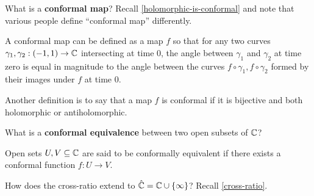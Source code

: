 \documentclass{homework}
\begin{document}
                                                    \begin{problem}
                                                      What is a \textbf{conformal map}?  Recall
                                                        \ref{holomorphic-is-conformal} and note that various people define
                                                          ``conformal map'' differently.
                                                          \end{problem}
                                                          \begin{solution}
                                                          A conformal map can be defined as a map $f$ so that for any two curves $\gamma_1, \gamma_2:(-1, 1) \to \mathbb{C}$ intersecting at time $0$, the angle between $\gamma_1$ and $\gamma_2$ at time zero is equal in magnitude to the angle between the curves $f\circ\gamma_1, f\circ \gamma_2$ formed by their images under $f$ at time $0$.
                                                              
                                                              Another definition is to say that a map $f$ is conformal if it is bijective and both holomorphic or antiholomorphic.
                                                              \end{solution}
                                                              \begin{problem}
                                                                What is a \textbf{conformal equivalence} between two open subsets of $\mathbb{C}$?
                                                                \end{problem}
                                                                \begin{solution}
                                                                Open sets $U, V\subseteq \mathbb{C}$ are said to be conformally equivalent if there exists a conformal function $f:U\to V$.
                                                                \end{solution}
                                                                \begin{problem}
                                                                  How does the cross-ratio extend to $\hat{\mathbb{C}} = \mathbb{C} \cup \{\infty\}$?
                                                                    Recall \ref{cross-ratio}.
                                                                    \end{problem}
\end{document}
